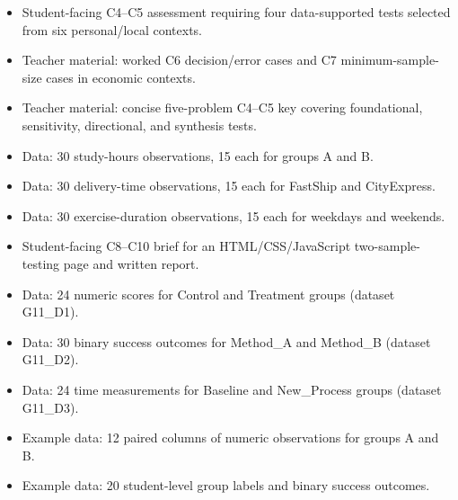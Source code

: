 \begin{itemize}
  \item {}

  Student-facing C4–C5 assessment requiring four data-supported tests selected from six personal/local contexts.

  \item {}

  Teacher material: worked C6 decision/error cases and C7 minimum-sample-size cases in economic contexts.

  \item {}

  Teacher material: concise five-problem C4–C5 key covering foundational, sensitivity, directional, and synthesis tests.

  \item {}

  Data: 30 study-hours observations, 15 each for groups A and B.

  \item {}

  Data: 30 delivery-time observations, 15 each for FastShip and CityExpress.

  \item {}

  Data: 30 exercise-duration observations, 15 each for weekdays and weekends.

  \item {}

  Student-facing C8–C10 brief for an HTML/CSS/JavaScript two-sample-testing page and written report.

  \item {}

  Data: 24 numeric scores for Control and Treatment groups (dataset G11\_D1).

  \item {}

  Data: 30 binary success outcomes for Method\_A and Method\_B (dataset G11\_D2).

  \item {}

  Data: 24 time measurements for Baseline and New\_Process groups (dataset G11\_D3).

  \item {}

  Example data: 12 paired columns of numeric observations for groups A and B.

  \item {}

  Example data: 20 student-level group labels and binary success outcomes.
\end{itemize}

